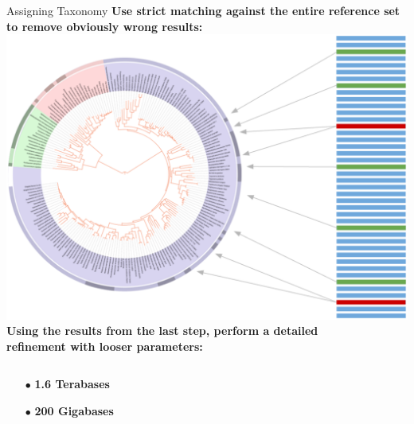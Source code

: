 \documentclass[final,t]{beamer}
\begin{document}
\begin{frame}{}
\begin{columns}[t]
\begin{column}{.3\linewidth}
        \begin{block}{Assigning Taxonomy}
            \textbf{Use strict matching against the entire reference set to remove obviously wrong results:}\\
            \includegraphics[width=.8\linewidth, right]{assets/Whole} \\
            \textbf{Using the results from the last step, perform a detailed\\ refinement with looser parameters:}
            \begin{columns}
                \begin{column}{.42\linewidth}
                    \begin{minipage}{\linewidth}
                        \begin{itemize}
                            \item[$\bullet$]\textbf{1.6 Terabases}
                            \item[$\bullet$]\textbf{200 Gigabases}
                        \end{itemize}
                    \end{minipage}
                \end{column}
                \begin{column}{.55\linewidth}
                    \begin{minipage}{\linewidth}

\end{minipage}
\end{column}
\end{columns}
\end{block}
\end{column}
\end{columns}
\end{frame}
\end{document}
